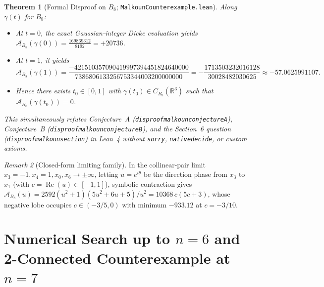 \documentclass[11pt]{amsart}
\renewcommand{\_}{\origunderscore\penalty0\relax}
\theoremstyle{plain}
\newtheorem{theorem}{Theorem}[section]
\theoremstyle{definition}
\theoremstyle{remark}
\newtheorem{remark}[theorem]{Remark}
\newcommand{\R}{\mathbb{R}}
\DeclareMathOperator{\RePart}{Re}
\begin{document}
\begin{theorem}[Formal Disproof on $B_8$; \texttt{MalkounCounterexample.lean}]\label{thm:barbell}
Along $\gamma(t)$ for $B_8$:
\begin{itemize}
    \item At $t = 0$, the exact Gaussian-integer Dicke evaluation yields $\mathcal{A}_{B_8}(\gamma(0)) = \frac{169869312}{8192} = +20736$.
    \item At $t = 1$, it yields
    \[
        \mathcal{A}_{B_8}(\gamma(1)) = \frac{-421510357090419997394451824640000}{7386806133256753344003200000000}
        = -\frac{1713503232016128}{30028482030625} \approx -57.0625991107.
    \]
    \item Hence there exists $t_0 \in [0, 1]$ with $\gamma(t_0) \in C_{B_8}(\R^3)$ such that $\mathcal{A}_{B_8}(\gamma(t_0)) = 0$.
\end{itemize}
This simultaneously refutes Conjecture~A (\texttt{disproof\_malkoun\_conjecture\_A}), Conjecture~B (\texttt{disproof\_malkoun\_conjecture\_B}), and the Section~6 question (\texttt{disproof\_malkoun\_section\_6}) in Lean~4 without \texttt{sorry}, \texttt{native\_decide}, or custom axioms.
\end{theorem}

\begin{remark}[Closed-form limiting family]
In the collinear-pair limit $x_3 = -1, x_4 = 1, x_0, x_6 \to \pm\infty$, letting $u = e^{i\theta}$ be the direction phase from $x_3$ to $x_1$ (with $c = \RePart(u) \in [-1, 1]$), symbolic contraction gives $\mathcal{A}_{B_8}(u) = 2592(u^2+1)(5u^2+6u+5)/u^2 = 10368\,c(5c+3)$, whose negative lobe occupies $c \in (-3/5, 0)$ with minimum $-933.12$ at $c = -3/10$.
\end{remark}

\section{Numerical Search up to $n = 6$ and 2-Connected Counterexample at $n = 7$}\label{sec:n7}
\end{document}
